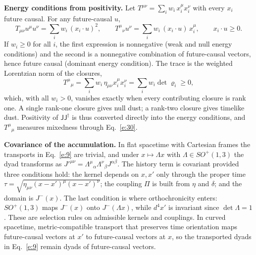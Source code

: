 \documentclass[10pt]{article}
\newcommand{\sJ}{\mathsf{J}}
\begin{document}
\noindent\textbf{Energy conditions from positivity.} Let $T^{\mu\nu}=\sum_iw_i\,x_i^\mu x_i^\nu$ with every $x_i$ future causal. For any future-causal $u$,
\begin{equation}
T_{\mu\nu}u^\mu u^\nu=\sum_iw_i\,(x_i\cdot u)^2,\qquad T^{\mu}{}_{\nu}u^\nu=\sum_iw_i\,(x_i\cdot u)\,x_i^\mu,\qquad x_i\cdot u\ge0.\label{e:57}
\end{equation}
If $w_i\ge0$ for all $i$, the first expression is nonnegative (weak and null energy conditions) and the second is a nonnegative combination of future-causal vectors, hence future causal (dominant energy condition). The trace is the weighted Lorentzian norm of the closures,
\begin{equation}
T^\mu{}_\mu=\sum_iw_i\,\eta_{\mu\nu}x_i^\mu x_i^\nu=\sum_iw_i\det\varrho_i\ge0,\label{e:58}
\end{equation}
which, with all $w_i>0$, vanishes exactly when every contributing closure is rank one. A single rank-one closure gives null dust; a rank-two closure gives timelike dust. Positivity of $\sJ\sJ^\dagger$ is thus converted directly into the energy conditions, and $T^\mu{}_\mu$ measures mixedness through Eq.~\eqref{e:30}.

\noindent\textbf{Covariance of the accumulation.} In flat spacetime with Cartesian frames the transports in Eq.~\eqref{e:9} are trivial, and under $x\mapsto\Lambda x$ with $\Lambda\in SO^+(1,3)$ the dyad transforms as $J'^{\mu\nu}=\Lambda^\mu{}_\alpha\Lambda^\nu{}_\beta J^{\alpha\beta}$. The history term is covariant provided three conditions hold: the kernel depends on $x,x'$ only through the proper time $\tau=\sqrt{\eta_{\mu\nu}(x-x')^\mu(x-x')^\nu}$; the coupling $\Pi$ is built from $\eta$ and $\delta$; and the domain is $J^-(x)$. The last condition is where orthochronicity enters: $SO^+(1,3)$ maps $J^-(x)$ onto $J^-(\Lambda x)$, while $d^4x'$ is invariant since $\det\Lambda=1$. These are selection rules on admissible kernels and couplings. In curved spacetime, metric-compatible transport that preserves time orientation maps future-causal vectors at $x'$ to future-causal vectors at $x$, so the transported dyads in Eq.~\eqref{e:9} remain dyads of future-causal vectors.
\end{document}
